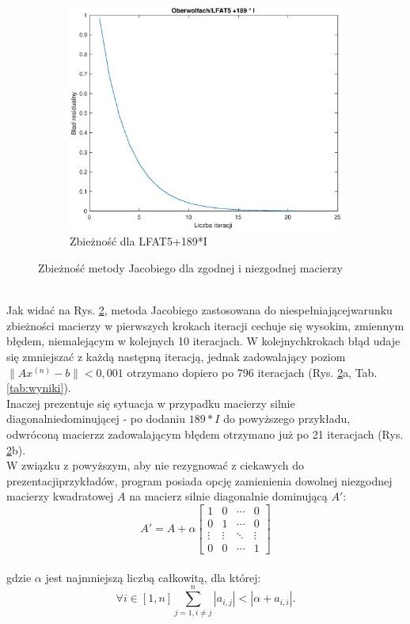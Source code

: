 \documentclass[a4paper,margin=1.54cm]{article}
\begin{document}
\begin{figure}[!ht]
\begin{subfigure}[!ht]{0.45\textwidth}
        \includegraphics[width=\textwidth]{5zbiega.eps}
        \caption{Zbieżność dla LFAT5+189*I}
        \label{fig:5niezbiega}
    \end{subfigure}
    \caption{Zbieżność metody Jacobiego dla zgodnej i niezgodnej macierzy}\label{fig:LFAT5}
\end{figure}
\\Jak widać na Rys. \ref{fig:LFAT5}, metoda Jacobiego zastosowana do niespełniającej\linebreak warunku zbieżności macierzy w pierwszych krokach iteracji cechuje się wysokim, zmiennym błędem, niemalejącym w kolejnych 10 iteracjach. W kolejnych\linebreak krokach błąd udaje się zmniejszać z każdą następną iteracją, jednak zadowalający poziom $\|Ax^{(n)} - b\| < 0,001$ otrzymano dopiero po 796 iteracjach (Rys. \ref{fig:LFAT5}a, Tab. \ref{tab:wyniki}).\\
Inaczej prezentuje się sytuacja w przypadku macierzy silnie diagonalnie\linebreak dominującej - po dodaniu $189*I$ do powyższego przykładu, odwróconą macierz\linebreak z zadowalającym błędem otrzymano już po 21 iteracjach (Rys. \ref{fig:LFAT5}b).\\
W związku z powyższym, aby nie rezygnować z ciekawych do prezentacji\linebreak przykładów, program posiada opcję zamienienia dowolnej niezgodnej macierzy kwadratowej $A$ na macierz silnie diagonalnie dominującą $A'$:
\[
A' = A + \alpha
 \begin{bmatrix}
  1 & 0 & \cdots & 0 \\
  0 & 1 & \cdots & 0 \\
  \vdots  & \vdots  & \ddots & \vdots  \\
  0 & 0 & \cdots & 1 
 \end{bmatrix}
\]
\\gdzie $\alpha$ jest najmniejszą liczbą całkowitą, dla której:
\[
    \forall i \in [1,n]  \sum_{j=1, i\neq j}^n |a_{i,j}| < |\alpha + a_{i,i}| \textrm{.}
\]
\newpage
\end{document}
